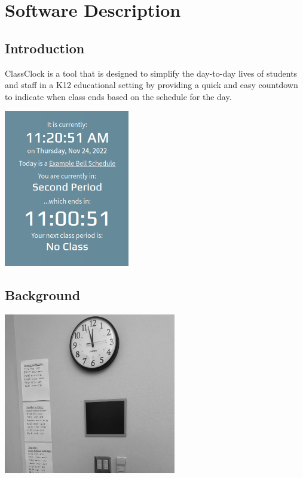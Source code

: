 \documentclass{article}
\begin{document}
\bigskip

\dosecttoc
\tableofcontents
\newpage

\section{Software Description}
\subsection{Introduction}
{ClassClock is a tool that is designed to simplify the day-to-day lives of students and staff in a K12 educational
setting by providing a quick and easy countdown to indicate when class ends based on the schedule for the day.}

\begin{center}
\includegraphics[width=2.1575in,height=2.6972in]{Mini20Manual-img002.png}
\end{center}

\subsection{Background}

\begin{center}
\includegraphics[width=2.9547in,height=2.7646in]{Mini20Manual-img003.jpg}
\end{center}
\end{document}
